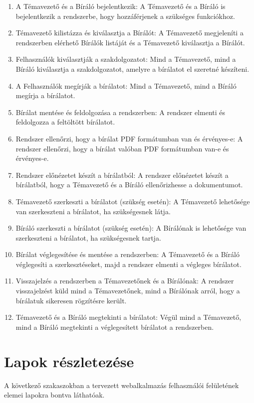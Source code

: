 \documentclass[a4paper,12pt]{article}
\begin{document}
\begin{enumerate}
\item A Témavezető és a Bíráló bejelentkezik: A Témavezető és a Bíráló is bejelentkezik a rendszerbe, hogy hozzáférjenek a szükséges funkciókhoz.
\item Témavezető kilistázza és kiválasztja a Bírálót: A Témavezető megjeleníti a rendszerben elérhető Bírálók listáját és a Témavezető kiválasztja a Bírálót.
\item Felhasználók kiválasztják a szakdolgozatot: Mind a Témavezető, mind a Bíráló kiválasztja a szakdolgozatot, amelyre a bírálatot el szeretné készíteni.
\item A Felhasználók megírják a bírálatot: Mind a Témavezető, mind a Bíráló megírja a bírálatot.
\item Bírálat mentése és feldolgozása a rendszerben: A rendszer elmenti és feldolgozza a feltöltött bírálatot.
\item Rendszer ellenőrzi, hogy a bírálat PDF formátumban van és érvényes-e: A rendszer ellenőrzi, hogy a bírálat valóban PDF formátumban van-e és érvényes-e.
\item Rendszer előnézetet készít a bírálatból: A rendszer előnézetet készít a bírálatból, hogy a Témavezető és a Bíráló ellenőrizhesse a dokumentumot.
\item Témavezető szerkeszti a bírálatot (szükség esetén): A Témavezető lehetősége van szerkeszteni a bírálatot, ha szükségesnek látja.
\item Bíráló szerkeszti a bírálatot (szükség esetén): A Bírálónak is lehetősége van szerkeszteni a bírálatot, ha szükségesnek tartja.
\item Bírálat véglegesítése és mentése a rendszerben: A Témavezető és a Bíráló véglegesíti a szerkesztéseket, majd a rendszer elmenti a végleges bírálatot.
\item Visszajelzés a rendszerben a Témavezetőnek és a Bírálónak: A rendszer visszajelzést küld mind a Témavezetőnek, mind a Bírálónak arról, hogy a bírálatuk sikeresen rögzítésre került.
\item Témavezető és a Bíráló megtekinti a bírálatot: Végül mind a Témavezető, mind a Bíráló megtekinti a véglegesített bírálatot a rendszerben.
\end{enumerate}

\section{Lapok részletezése}

A következő szakaszokban a tervezett webalkalmazás felhasználói felületének elemei lapokra bontva láthatóak.
\end{document}
